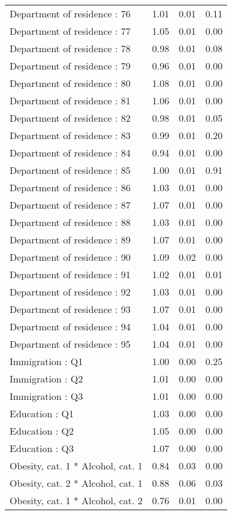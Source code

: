 \documentclass[risks,article,submit,moreauthors,pdftex]{Definitions/mdpi}
\begin{document}
\begin{longtable}{lrrr}
Department of residence : 76 & 1.01 & 0.01 & 0.11 \\ 
Department of residence : 77 & 1.05 & 0.01 & 0.00 \\ 
Department of residence : 78 & 0.98 & 0.01 & 0.08 \\ 
Department of residence : 79 & 0.96 & 0.01 & 0.00 \\ 
Department of residence : 80 & 1.08 & 0.01 & 0.00 \\ 
Department of residence : 81 & 1.06 & 0.01 & 0.00 \\ 
Department of residence : 82 & 0.98 & 0.01 & 0.05 \\ 
Department of residence : 83 & 0.99 & 0.01 & 0.20 \\ 
Department of residence : 84 & 0.94 & 0.01 & 0.00 \\ 
Department of residence : 85 & 1.00 & 0.01 & 0.91 \\ 
Department of residence : 86 & 1.03 & 0.01 & 0.00 \\ 
Department of residence : 87 & 1.07 & 0.01 & 0.00 \\ 
Department of residence : 88 & 1.03 & 0.01 & 0.00 \\ 
Department of residence : 89 & 1.07 & 0.01 & 0.00 \\ 
Department of residence : 90 & 1.09 & 0.02 & 0.00 \\ 
Department of residence : 91 & 1.02 & 0.01 & 0.01 \\ 
Department of residence : 92 & 1.03 & 0.01 & 0.00 \\ 
Department of residence : 93 & 1.07 & 0.01 & 0.00 \\ 
Department of residence : 94 & 1.04 & 0.01 & 0.00 \\ 
Department of residence : 95 & 1.04 & 0.01 & 0.00 \\ 
Immigration : Q1 & 1.00 & 0.00 & 0.25 \\ 
Immigration : Q2 & 1.01 & 0.00 & 0.00 \\ 
Immigration : Q3 & 1.01 & 0.00 & 0.00 \\ 
Education : Q1 & 1.03 & 0.00 & 0.00 \\ 
Education : Q2 & 1.05 & 0.00 & 0.00 \\ 
Education : Q3 & 1.07 & 0.00 & 0.00 \\ 
Obesity, cat. 1 * Alcohol, cat. 1 & 0.84 & 0.03 & 0.00 \\ 
Obesity, cat. 2 * Alcohol, cat. 1 & 0.88 & 0.06 & 0.03 \\ 
Obesity, cat. 1 * Alcohol, cat. 2 & 0.76 & 0.01 & 0.00 \\ 

\end{longtable}
\end{document}
